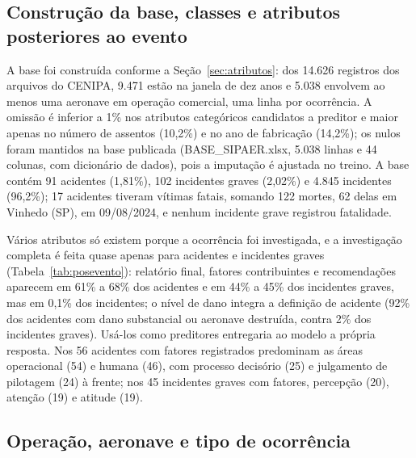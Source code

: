 \documentclass[12pt]{article}
\begin{document}
\subsection{Construção da base, classes e atributos posteriores ao evento}
\label{sec:base}

A base foi construída conforme a Seção~\ref{sec:atributos}: dos 14.626 registros dos arquivos do CENIPA, 9.471 estão na janela de dez anos e 5.038 envolvem ao menos uma aeronave em operação comercial, uma linha por ocorrência. A omissão é inferior a 1\% nos atributos categóricos candidatos a preditor e maior apenas no número de assentos (10,2\%) e no ano de fabricação (14,2\%); os nulos foram mantidos na base publicada (BASE\_SIPAER.xlsx, 5.038 linhas e 44 colunas, com dicionário de dados), pois a imputação é ajustada no treino. A base contém 91 acidentes (1,81\%), 102 incidentes graves (2,02\%) e 4.845 incidentes (96,2\%); 17 acidentes tiveram vítimas fatais, somando 122 mortes, 62 delas em Vinhedo (SP), em 09/08/2024, e nenhum incidente grave registrou fatalidade.

Vários atributos só existem porque a ocorrência foi investigada, e a investigação completa é feita quase apenas para acidentes e incidentes graves (Tabela~\ref{tab:posevento}): relatório final, fatores contribuintes e recomendações aparecem em 61\% a 68\% dos acidentes e em 44\% a 45\% dos incidentes graves, mas em 0,1\% dos incidentes; o nível de dano integra a definição de acidente (92\% dos acidentes com dano substancial ou aeronave destruída, contra 2\% dos incidentes graves). Usá-los como preditores entregaria ao modelo a própria resposta. Nos 56 acidentes com fatores registrados predominam as áreas operacional (54) e humana (46), com processo decisório (25) e julgamento de pilotagem (24) à frente; nos 45 incidentes graves com fatores, percepção (20), atenção (19) e atitude (19).

\begin{table}[htbp]
    \centering
    \caption{Atributos produzidos pela investigação, por classe}
    \vspace{0.05cm}
    \footnotesize\setlength{\tabcolsep}{3.5pt}\renewcommand{\arraystretch}{0.88}
    
    \label{tab:posevento}
\end{table}

\subsection{Operação, aeronave e tipo de ocorrência}
\label{sec:operacao}
\end{document}
